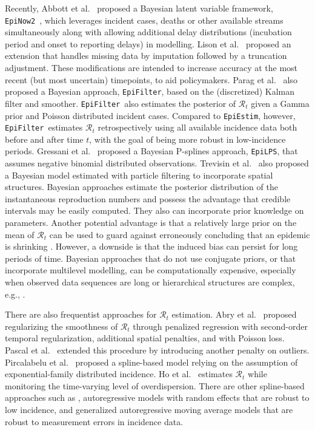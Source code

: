 \documentclass[10pt,letterpaper]{article}
\def\EpiEstim{\texttt{EpiEstim}}
\def\EpiLPS{\texttt{EpiLPS}}
\def\EpiFilter{\texttt{EpiFilter}}
\def\EpiNow2{\texttt{EpiNow2}}
\def\calR{\mathcal{R}}
\begin{document}
Recently, Abbott et al.~\cite{abbott2020estimating} proposed a
Bayesian latent variable framework, \EpiNow2~\cite{EpiNow2}, which leverages
incident cases, deaths or other available streams simultaneously along with
allowing additional delay distributions (incubation period and onset to
reporting delays) in modelling. Lison et al.~\cite{lison2024generative} proposed
an extension that handles missing data by imputation followed by a truncation
adjustment. These modifications are intended to increase accuracy at the most
recent (but most uncertain) timepoints, to aid policymakers. Parag et
al.~\cite{parag2021improved} also proposed a Bayesian approach, \EpiFilter,
based on the (discretized) Kalman filter and smoother. \EpiFilter\ also
estimates the posterior of $\calR_t$ given a Gamma prior and Poisson distributed
incident cases. Compared to \EpiEstim, however, \EpiFilter\ estimates $\calR_t$
retrospectively using all available incidence data both before and after time
$t$, with the goal of being more robust in low-incidence periods. Gressani et
al.~\cite{gressani2022epilps} proposed a Bayesian P-splines approach, \EpiLPS,
that assumes negative binomial distributed observations. Trevisin et
al.~\cite{trevisin2023spatially} also proposed a Bayesian model estimated with
particle filtering to incorporate spatial structures. Bayesian approaches
estimate the posterior distribution of the instantaneous reproduction numbers
and possess the advantage that credible intervals may be easily computed. They
also can incorporate prior knowledge on parameters. Another potential advantage
is that a relatively large prior on the mean of $\calR_t$ can be used to guard
against erroneously concluding that an epidemic is shrinking
\cite{thompson2019improved}. However, a downside is that the induced bias can
persist for long periods of time. Bayesian approaches that do not use conjugate
priors, or that incorporate multilevel modelling, can be computationally
expensive, especially when observed data sequences are long or hierarchical
structures are complex, e.g., \cite{abbott2020estimating}. 


There are also frequentist approaches for $\calR_t$ estimation. Abry et
al.~\cite{abry2020spatial} proposed regularizing the smoothness of $\calR_t$
through penalized regression with second-order temporal regularization,
additional spatial penalties, and with Poisson loss. Pascal et
al.~\cite{pascal2022nonsmooth} extended this procedure by introducing another
penalty on outliers. Pircalabelu et al.~\cite{pircalabelu2023spline} proposed a
spline-based model relying on the assumption of exponential-family distributed
incidence. Ho et al.~\cite{ho2023accounting} estimates $\calR_t$ while
monitoring the time-varying level of overdispersion. There are other
spline-based approaches such as
\cite{azmon2014estimation,gressani2021approximate}, autoregressive models with
random effects \cite{jin2023epimix} that are robust to low incidence, and
generalized autoregressive moving average models \cite{hettinger2023estimating}
that are robust to measurement errors in incidence data. 
\end{document}
